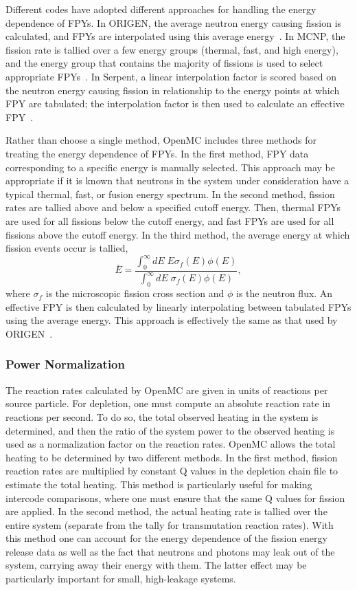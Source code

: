 \documentclass[3p,authoryear]{elsarticle}
\begin{document}
Different codes have adopted different approaches for handling the energy
dependence of FPYs. In ORIGEN, the average neutron energy causing fission is
calculated, and FPYs are interpolated using this average
energy~\citep{gauld2011nt}. In MCNP, the fission rate is tallied over a few
energy groups (thermal, fast, and high energy), and the energy group that
contains the majority of fissions is used to select appropriate
FPYs~\citep{fensin2008nt,fensin2011lanl}. In Serpent, a linear interpolation
factor is scored based on the neutron energy causing fission in relationship to
the energy points at which FPY are tabulated; the interpolation factor is then
used to calculate an effective FPY~\citep{kunchev2019mc}.

Rather than choose a single method, OpenMC includes three methods for treating
the energy dependence of FPYs. In the first method, FPY data corresponding to a
specific energy is manually selected. This approach may be appropriate if it is
known that neutrons in the system under consideration have a typical thermal,
fast, or fusion energy spectrum. In the second method, fission rates are tallied
above and below a specified cutoff energy. Then, thermal FPYs are used for all
fissions below the cutoff energy, and fast FPYs are used for all fissions above
the cutoff energy. In the third method, the average energy at which fission
events occur is tallied,
\begin{equation}
  \bar{E} = \frac{\int_0^\infty dE \; E \sigma_f(E)\phi(E)}{\int_0^\infty dE \; \sigma_f(E) \phi(E)},
\end{equation}
where $\sigma_f$ is the microscopic fission cross section and $\phi$ is the
neutron flux. An effective FPY is then calculated by linearly interpolating
between tabulated FPYs using the average energy. This approach is effectively
the same as that used by ORIGEN~\citep{gauld2011nt}.

\subsubsection{Power Normalization}

The reaction rates calculated by OpenMC are given in units of reactions per
source particle. For depletion, one must compute an absolute reaction rate in
reactions per second. To do so, the total observed heating in the system is
determined, and then the ratio of the system power to the observed heating is
used as a normalization factor on the reaction rates. OpenMC allows the total
heating to be determined by two different methods. In the first method, fission
reaction rates are multiplied by constant Q values in the depletion chain file
to estimate the total heating. This method is particularly useful for making
intercode comparisons, where one must ensure that the same Q values for fission
are applied. In the second method, the actual heating rate is tallied over the
entire system (separate from the tally for transmutation reaction rates). With
this method one can account for the energy dependence of the fission energy
release data as well as the fact that neutrons and photons may leak out of the
system, carrying away their energy with them. The latter effect may be
particularly important for small, high-leakage systems.
\end{document}
